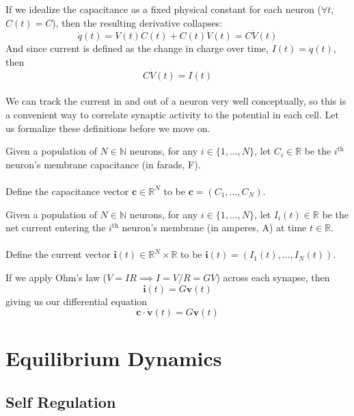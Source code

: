 \documentclass{article}
\begin{document}
If we idealize the capacitance as a fixed physical constant for each neuron ($\forall t$, $C(t)=C$), then the resulting derivative collapses:
\[ \dot{q}(t) = V(t)\dot{C}(t) + C(t)\dot{V}(t) = C\dot{V}(t) \]
And since current is defined as the change in charge over time, $I(t) = \dot{q}(t)$, then
\[ C\dot{V}(t) = I(t) \]

\paragraph{}
We can track the current in and out of a neuron very well conceptually, so this is a convenient way to correlate synaptic activity to the potential in each cell. Let us formalize these definitions before we move on.

\begin{definition}[$\mathbf{c} = \textbf{membrane capacitance vector}$]\label{c}
Given a population of $N\in\mathbb{N}$ neurons, for any $i \in \{ 1, \dots, N \}$, let $C_{i}\in\mathbb{R}$ be the $i^{\text{th}}$ neuron's membrane capacitance (in farads, F).\\
\\
Define the capacitance vector $\mathbf{c}\in\mathbb{R}^{N}$ to be $\mathbf{c} = ( C_{1}, \dots, C_{N} )$. 
\end{definition}

\begin{definition}[$\mathbf{i}(t) = \textbf{incoming current vector}$]\label{i}
Given a population of $N\in\mathbb{N}$ neurons, for any $i \in \{ 1, \dots, N \}$, let $I_{i}(t)\in\mathbb{R}$ be the net current entering the $i^{\text{th}}$ neuron's membrane (in amperes, A) at time $t\in\mathbb{R}$.\\
\\
Define the current vector $\mathbf{i}(t)\in\mathbb{R}^{N}\times\mathbb{R}$ to be $\mathbf{i}(t) = ( I_{1}(t), \dots, I_{N}(t) )$.
\end{definition}

If we apply Ohm's law ($V=IR\implies I=V/R=GV$) across each synapse, then
\[ \mathbf{i}(t) = G\mathbf{v}(t) \]
giving us our differential equation
\[ \mathbf{c}\cdot\dot{\mathbf{v}}(t) = G\mathbf{v}(t) \]

\section{Equilibrium Dynamics}

\subsection{Self Regulation}
\end{document}
